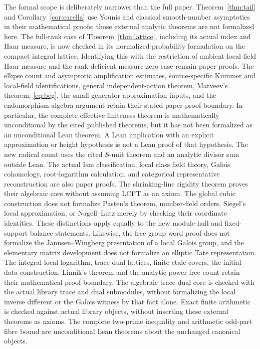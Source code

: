 \documentclass[11pt]{amsart}
\theoremstyle{definition}
\theoremstyle{remark}
\begin{document}
The formal scope is deliberately narrower than the full paper.
Theorem~\ref{thm:tail} and Corollary~\ref{cor:carella} use Younis and classical
smooth-number asymptotics in their mathematical proofs; those external
analytic theorems are not formalized here. The full-rank case of
Theorem~\ref{thm:lattice}, including its actual index and Haar measure,
is now checked in its normalized-probability formulation on the compact
integral lattice. Identifying this with the restriction of ambient
local-field Haar measure and the rank-deficient measure-zero case remain
paper proofs. The ellipse count and asymptotic amplification estimates,
source-specific Kummer and local-field identifications, general
independent-action theorem, Matveev's theorem, \eqref{eq:beg}, the
small-generator approximation inputs, and the endomorphism-algebra
argument retain their stated paper-proof boundary. In particular, the
complete effective finiteness theorem is mathematically unconditional
by the cited published theorems, but it has not been formalized as an
unconditional Lean theorem. A Lean implication with an explicit
approximation or height hypothesis is not a Lean proof of that hypothesis.
The new radical count uses the cited $S$-unit theorem and an analytic
divisor sum outside Lean. The actual Ism classification, local class field
theory, Galois cohomology, root-logarithm calculation, and categorical
representative reconstruction are also paper proofs. The shrinking-line
rigidity theorem proves their algebraic core without assuming LCFT as an
axiom. The global cubic construction does not formalize Pasten's theorem,
number-field orders, Siegel's local approximation, or Nagell--Lutz merely
by checking their coordinate identities. These distinctions apply equally
to the new module-hull and fixed-support balance statements.
Likewise, the free-group word proof does not formalize the
Jannsen--Wingberg presentation of a local Galois group, and the elementary
matrix development does not formalize an elliptic Tate representation.
The integral local logarithm, trace-dual lattices, finite-etale covers,
the initial-data construction, Linnik's theorem and the analytic
power-free count retain their mathematical proof boundary. The algebraic
trace-dual core is checked with the actual library trace and dual
submodules, without formalizing the local inverse different or the
Galois witness by that fact alone. Exact finite
arithmetic is checked against actual library objects, without inserting
these external theorems as axioms.
The complete two-prime inequality and arithmetic odd-part fibre bound
are unconditional Lean theorems about the unchanged canonical objects.
\end{document}
